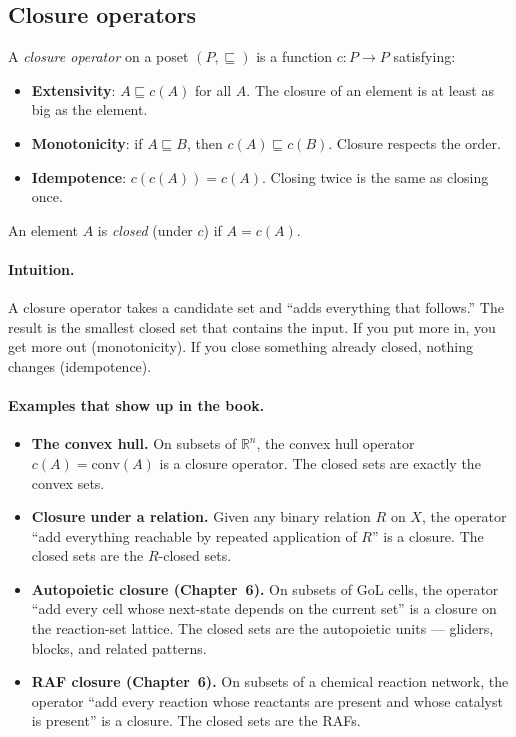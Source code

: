\subsection*{Closure operators}

A \emph{closure operator} on a poset $(P, \sqsubseteq)$ is a function
$c : P \to P$ satisfying:

\begin{itemize}[leftmargin=1.5em,itemsep=2pt]
  \item \textbf{Extensivity}: $A \sqsubseteq c(A)$ for all $A$. The
    closure of an element is at least as big as the element.
  \item \textbf{Monotonicity}: if $A \sqsubseteq B$, then $c(A)
    \sqsubseteq c(B)$. Closure respects the order.
  \item \textbf{Idempotence}: $c(c(A)) = c(A)$. Closing twice is the
    same as closing once.
\end{itemize}

An element $A$ is \emph{closed} (under $c$) if $A = c(A)$.

\paragraph{Intuition.} A closure operator takes a candidate set and
``adds everything that follows.'' The result is the smallest closed
set that contains the input. If you put more in, you get more out
(monotonicity). If you close something already closed, nothing
changes (idempotence).

\paragraph{Examples that show up in the book.}

\begin{itemize}[leftmargin=1.5em,itemsep=2pt]
  \item \textbf{The convex hull.} On subsets of $\mathbb{R}^n$, the
    convex hull operator $c(A) = \mathrm{conv}(A)$ is a closure
    operator. The closed sets are exactly the convex sets.
  \item \textbf{Closure under a relation.} Given any binary relation
    $R$ on $X$, the operator ``add everything reachable by repeated
    application of $R$'' is a closure. The closed sets are the
    $R$-closed sets.
  \item \textbf{Autopoietic closure (Chapter~6).} On subsets of GoL
    cells, the operator ``add every cell whose next-state depends on
    the current set'' is a closure on the reaction-set lattice. The
    closed sets are the autopoietic units --- gliders, blocks, and
    related patterns.
  \item \textbf{RAF closure (Chapter~6).} On subsets of a chemical
    reaction network, the operator ``add every reaction whose
    reactants are present and whose catalyst is present'' is a
    closure. The closed sets are the RAFs.
\end{itemize}

